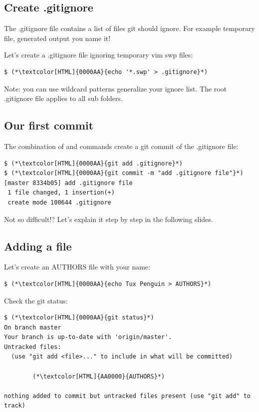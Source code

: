 \subsection{Create .gitignore}
\begin{frame}[fragile]
  \subslidetitle
  The .gitignore file contains a list of files git should ignore. For example temporary file, generated output you name it!

  \vspace{1em}
  Let's create a .gitignore file ignoring temporary vim swp files:
  \begin{lstlisting}
$ (*\textcolor[HTML]{0000AA}{echo '*.swp' > .gitignore}*)
\end{lstlisting}

  \vspace{1em}
  Note: you can use wildcard patterns generalize your ignore list. The root .gitignore file applies to all sub folders.

\end{frame}

\subsection{Our first commit}
\begin{frame}[fragile]
  \subslidetitle

  The combination of  and  commands create a git commit of the .gitignore file:
  \begin{lstlisting}
$ (*\textcolor[HTML]{0000AA}{git add .gitignore}*)
$ (*\textcolor[HTML]{0000AA}{git commit -m "add .gitignore file"}*)
[master 8334b05] add .gitignore file
 1 file changed, 1 insertion(+)
 create mode 100644 .gitignore
\end{lstlisting}

Not so difficult!? Let's explain it step by step in the following slides.
\end{frame}

\subsection{Adding a file}
\begin{frame}[fragile]
  \subslidetitle

  Let's create an AUTHORS file with your name:
  \begin{lstlisting}
$ (*\textcolor[HTML]{0000AA}{echo Tux Penguin > AUTHORS}*)
\end{lstlisting}

  Check the git status:
  \begin{lstlisting}
$ (*\textcolor[HTML]{0000AA}{git status}*)
On branch master
Your branch is up-to-date with 'origin/master'.
Untracked files:
  (use "git add <file>..." to include in what will be committed)

        (*\textcolor[HTML]{AA0000}{AUTHORS}*)

nothing added to commit but untracked files present (use "git add" to track)
\end{lstlisting}

\end{frame}

